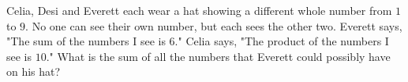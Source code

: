 Celia, Desi and Everett each wear a hat showing a different whole number from $1$ to $9$. No one can see their own number, but each sees the other two. Everett says, "The sum of the numbers I see is $6$." Celia says, "The product of the numbers I see is $10$." What is the sum of all the numbers that Everett could possibly have on his hat?
